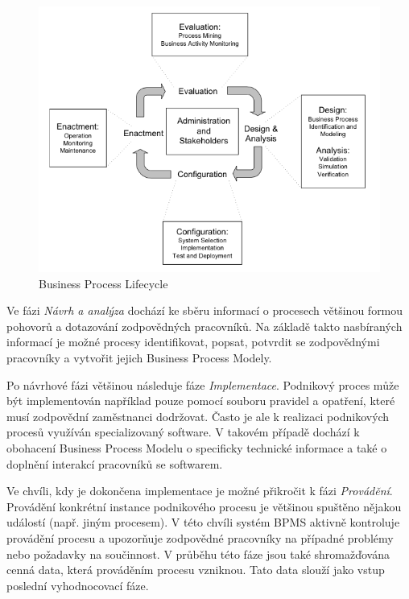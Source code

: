 \documentclass[]{article}
\begin{document}
\begin{figure}[H]\centering %
\includegraphics[width=1.0\textwidth]{obrazky/processLifecycle}
\caption{Business Process Lifecycle \cite{Weske2007}}
\label{fig:BusinessProcessLifecycle}
\end{figure}

Ve fázi \textit{Návrh a analýza} dochází ke sběru informací o procesech většinou formou pohovorů a dotazování zodpovědných pracovníků. Na základě takto nasbíraných informací je možné procesy identifikovat, popsat, potvrdit se zodpovědnými pracovníky a vytvořit jejich Business Process Modely.

Po návrhové fázi většinou následuje fáze \textit{Implementace}. Podnikový proces může být implementován například pouze  pomocí souboru pravidel a opatření, které musí zodpovědní zaměstnanci dodržovat. Často je ale k realizaci podnikových procesů využíván specializovaný software. V takovém případě dochází k obohacení Business Process Modelu o specificky technické informace a také o doplnění interakcí pracovníků se softwarem.

Ve chvíli, kdy je dokončena implementace je možné přikročit k fázi \textit{Provádění}. Provádění konkrétní instance podnikového procesu je většinou spuštěno nějakou událostí (např. jiným procesem). V této chvíli systém BPMS aktivně kontroluje provádění procesu a upozorňuje zodpovědné pracovníky na případné problémy nebo požadavky na součinnost. V průběhu této fáze jsou také shromažďována cenná data, která prováděním procesu vzniknou. Tato data slouží jako vstup poslední vyhodnocovací fáze.
\end{document}
